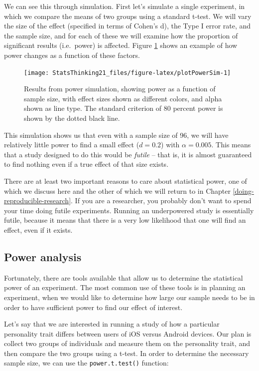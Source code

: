 \documentclass[12pt,]{book}
\begin{document}
We can see this through simulation. First let's simulate a single experiment, in which we compare the means of two groups using a standard t-test. We will vary the size of the effect (specified in terms of Cohen's d), the Type I error rate, and the sample size, and for each of these we will examine how the proportion of significant results (i.e.~power) is affected. Figure \ref{fig:plotPowerSim} shows an example of how power changes as a function of these factors.

\begin{figure}
\texttt{[image: StatsThinking21\_files/figure-latex/plotPowerSim-1]} \caption{Results from power simulation, showing power as a function of sample size, with effect sizes shown as different colors, and alpha shown as line type. The standard criterion of 80 percent power is shown by the dotted black line.}\label{fig:plotPowerSim}
\end{figure}

This simulation shows us that even with a sample size of 96, we will have relatively little power to find a small effect (\(d = 0.2\)) with \(\alpha = 0.005\). This means that a study designed to do this would be \emph{futile} -- that is, it is almost guaranteed to find nothing even if a true effect of that size exists.

There are at least two important reasons to care about statistical power, one of which we discuss here and the other of which we will return to in Chapter \ref{doing-reproducible-research}. If you are a researcher, you probably don't want to spend your time doing futile experiments. Running an underpowered study is essentially futile, because it means that there is a very low likelihood that one will find an effect, even if it exists.

\hypertarget{power-analysis}{%
\subsection{Power analysis}\label{power-analysis}}

Fortunately, there are tools available that allow us to determine the statistical power of an experiment. The most common use of these tools is in planning an experiment, when we would like to determine how large our sample needs to be in order to have sufficient power to find our effect of interest.

Let's say that we are interested in running a study of how a particular personality trait differs between users of iOS versus Android devices. Our plan is collect two groups of individuals and measure them on the personality trait, and then compare the two groups using a t-test. In order to determine the necessary sample size, we can use the \texttt{power.t.test()} function:
\end{document}
